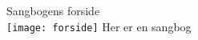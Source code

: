 \documentclass[article,oneside,a5paper,10pt]{memoir}
\begin{document}
%
\nonstopmode%
\setcounter{collectmore}{3}%
Sangbogens forside\\
\noindent\texttt{[image: forside]}
\thispagestyle{empty}\clearpage
Her er en sangbog

\tableofcontents\clearpage%
\clearpage%
\setcounter{chapter}{11}\clearpage%

\batchmode%
\end{document}
